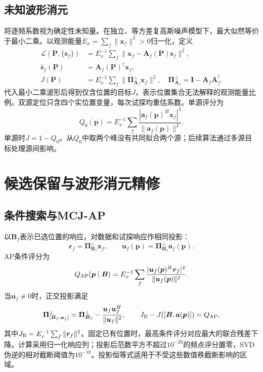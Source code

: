 \documentclass[a4paper,fleqn]{cas-sc}
\begin{document}
\subsection{未知波形消元}
将逐频系数视为确定性未知量。在独立、等方差复高斯噪声模型下，最大似然等价于最小二乘。以观测能量$E_x=\sum_f\|\bm x_f\|^2>0$归一化，定义
\begin{align}
\mathcal L(\bm P,\{\bm s_f\})&=E_x^{-1}\sum_f
 \|\bm x_f-\bm A_f(\bm P)\bm s_f\|^2,\\
\widehat{\bm s}_f(\bm P)&=\bm A_f(\bm P)^\dagger\bm x_f,\label{en:waveLS}\\
J(\bm P)&=E_x^{-1}\sum_f\|\bm\Pi_{\bm A_f}^{\perp}\bm x_f\|^2,
\quad \bm\Pi_{\bm A_f}^{\perp}=\bm I-\bm A_f\bm A_f^\dagger.
\label{en:profile}
\end{align}
代入最小二乘波形后得到仅含位置的目标$J$\cite{GolubPereyra1973}，表示位置集合无法解释的观测能量比例。双源定位只含四个实位置变量，每次试探均重估系数。单源评分为
\begin{equation}
Q_0(\bm p)=E_x^{-1}\sum_f
 \frac{|\bm a_f(\bm p)^H\bm x_f|^2}{\|\bm a_f(\bm p)\|^2}.
\label{en:single}
\end{equation}
单源时$J=1-Q_0$。从$Q_0$中取两个峰没有共同拟合两个源；后续算法通过多源目标处理源间影响。

\FloatBarrier
\section{候选保留与波形消元精修}
\FloatBarrier
\subsection{条件搜索与MCJ-AP}
以$\bm B_f$表示已选位置的响应，对数据和试探响应作相同投影：
\begin{equation}
\bm r_f=\bm\Pi_{\bm B_f}^{\perp}\bm x_f,\qquad
\bm u_f(\bm p)=\bm\Pi_{\bm B_f}^{\perp}\bm a_f(\bm p).
\end{equation}
AP条件评分为
\begin{equation}
Q_{\rm AP}(\bm p\mid\bm B)=E_x^{-1}\sum_f
 \frac{|\bm u_f(\bm p)^H\bm r_f|^2}{\|\bm u_f(\bm p)\|^2}.
\label{en:conditional}
\end{equation}
当$\bm u_f\ne0$时，正交投影满足
\begin{equation}
\bm\Pi_{[\bm B_f,\bm a_f]}^{\perp}
=\bm\Pi_{\bm B_f}^{\perp}-\frac{\bm u_f\bm u_f^H}{\|\bm u_f\|^2},
\qquad J_{\rm B}-J([\bm B,\bm a(\bm p)])=Q_{\rm AP},
\label{en:gain}
\end{equation}
其中$J_{\rm B}=E_x^{-1}\sum_f\|\bm r_f\|^2$。固定已有位置时，最高条件评分对应最大的联合残差下降\cite{ChenHudsonYao2002}。计算采用归一化响应列；投影后范数平方不超过$10^{-20}$的频点评分置零，SVD伪逆的相对截断阈值为$10^{-10}$。投影恒等式适用于不受这些数值秩截断影响的区域。
\end{document}
